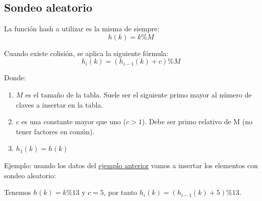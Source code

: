 \documentclass[10pt,a4paper,spanish]{report}
\begin{document}
\subsection{\textcolor[rgb]{0.3,0.4,0.8}Sondeo aleatorio}
\noindent
La función hash a utilizar es la misma de siempre:
\begin{displaymath}
h(k) = k \% M
\end{displaymath}

\noindent
Cuando existe colisión, se aplica la siguiente fórmula:
\begin{displaymath}
h_i (k) = (h_{i-1} (k) + c) \% M
\end{displaymath}

\noindent
Donde:
\begin{enumerate}[---]
      \item $M$ es el tamaño de la tabla. Suele ser el siguiente primo mayor al número de claves a insertar en la tabla.
      \item $c$ es una constante mayor que uno ($c > 1$). Debe ser primo relativo de M (no tener factores en común).
      \item $h_1 (k) = h (k)$
\end{enumerate}

\noindent
Ejemplo: usando los datos del \hyperref[ejemplo2]{ejemplo anterior} vamos a insertar los elementos con sondeo aleatorio:

\noindent
Tenemos $h(k) = k \% 13$ y $c = 5$, por tanto $h_i (k) = (h_{i-1} (k) + 5) \% 13$.
\end{document}
